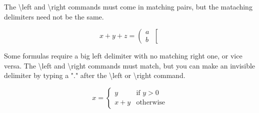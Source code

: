 \documentclass[twocolumn]{book}        %
\begin{document}
The \textbackslash left and \textbackslash right commands must come in matching pairs, but the mataching
delimiters need not be the same.

\[ x + y + z = \left( \begin{array}{c}
    a \\ b 
\end{array}     \right[ \]

Some formulas require a big left delimiter with no matching right one, or vice versa. 
The \textbackslash left and \textbackslash right commands must match, but you can make an 
invisible delimiter by typing a "." after the \textbackslash left or \textbackslash right
command.

\[ x = \left\{ \begin{array}{ll} 
    y & \mbox{if $y>0$} \\
    x+y & \mbox{otherwise} 
\end{array}
\right. \]
\end{document}
